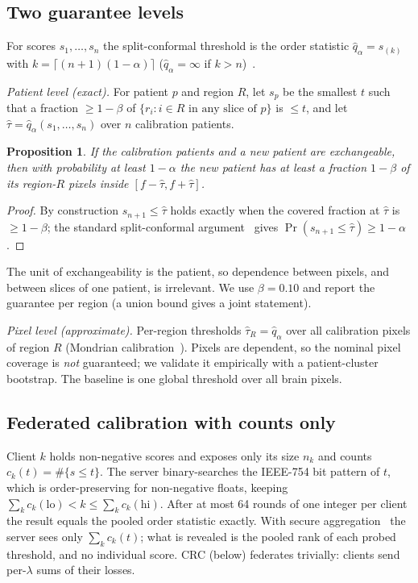 \documentclass[conference]{IEEEtran}
\newtheorem{proposition}{Proposition}
\begin{document}
\subsection{Two guarantee levels}
For scores $s_1,\dots,s_n$ the split-conformal threshold is the order statistic $\hat q_\alpha=s_{(k)}$ with $k=\lceil (n+1)(1-\alpha)\rceil$ ($\hat q_\alpha=\infty$ if $k>n$)~\cite{lei2018distribution}.

\emph{Patient level (exact).} For patient $p$ and region $R$, let $s_p$ be the smallest $t$ such that a fraction $\geq 1-\beta$ of $\{r_i : i \in R \text{ in any slice of } p\}$ is $\leq t$, and let $\hat\tau=\hat q_\alpha(s_1,\dots,s_n)$ over $n$ calibration patients.
\begin{proposition}
If the calibration patients and a new patient are exchangeable, then with probability at least $1-\alpha$ the new patient has at least a fraction $1-\beta$ of its region-$R$ pixels inside $[f-\hat\tau, f+\hat\tau]$.
\end{proposition}
\begin{proof}
By construction $s_{n+1}\le\hat\tau$ holds exactly when the covered fraction at $\hat\tau$ is $\geq 1-\beta$; the standard split-conformal argument~\cite{vovk2005alrw,lei2018distribution} gives $\Pr(s_{n+1}\le\hat\tau)\ge 1-\alpha$.
\end{proof}
The unit of exchangeability is the patient, so dependence between pixels, and between slices of one patient, is irrelevant. We use $\beta=0.10$ and report the guarantee per region (a union bound gives a joint statement).

\emph{Pixel level (approximate).} Per-region thresholds $\hat\tau_R=\hat q_\alpha$ over all calibration pixels of region $R$ (Mondrian calibration~\cite{vovk2005alrw}). Pixels are dependent, so the nominal pixel coverage is \emph{not} guaranteed; we validate it empirically with a patient-cluster bootstrap. The baseline is one global threshold over all brain pixels.

\subsection{Federated calibration with counts only}
Client $k$ holds non-negative scores and exposes only its size $n_k$ and counts $c_k(t)=\#\{s\le t\}$. The server binary-searches the IEEE-754 bit pattern of $t$, which is order-preserving for non-negative floats, keeping $\sum_k c_k(\text{lo})<k\le\sum_k c_k(\text{hi})$. After at most 64 rounds of one integer per client the result equals the pooled order statistic exactly. With secure aggregation~\cite{bonawitz2017secagg} the server sees only $\sum_k c_k(t)$; what is revealed is the pooled rank of each probed threshold, and no individual score. CRC (below) federates trivially: clients send per-$\lambda$ sums of their losses.
\end{document}
